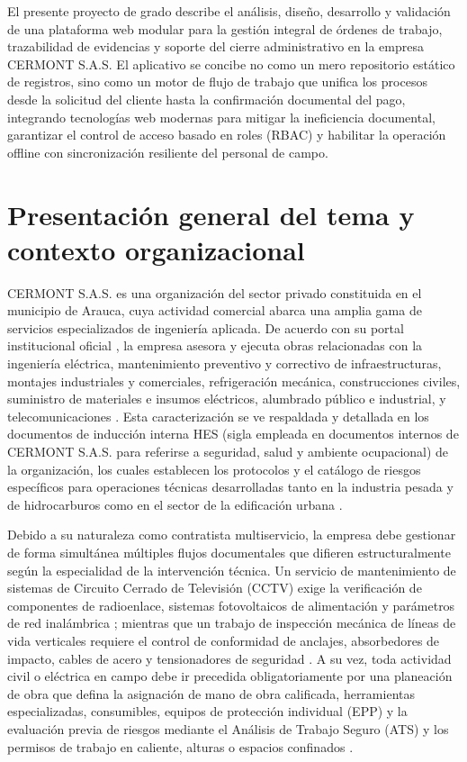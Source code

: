El presente proyecto de grado describe el análisis, diseño, desarrollo y validación de una plataforma web modular para la gestión integral de órdenes de trabajo, trazabilidad de evidencias y soporte del cierre administrativo en la empresa CERMONT S.A.S. El aplicativo se concibe no como un mero repositorio estático de registros, sino como un motor de flujo de trabajo que unifica los procesos desde la solicitud del cliente hasta la confirmación documental del pago, integrando tecnologías web modernas para mitigar la ineficiencia documental, garantizar el control de acceso basado en roles (RBAC) y habilitar la operación offline con sincronización resiliente del personal de campo.

\section{Presentación general del tema y contexto organizacional}
\label{sec:presentacion-general}

CERMONT S.A.S. es una organización del sector privado constituida en el municipio de Arauca, cuya actividad comercial abarca una amplia gama de servicios especializados de ingeniería aplicada. De acuerdo con su portal institucional oficial \cite{cermont_web}, la empresa asesora y ejecuta obras relacionadas con la ingeniería eléctrica, mantenimiento preventivo y correctivo de infraestructuras, montajes industriales y comerciales, refrigeración mecánica, construcciones civiles, suministro de materiales e insumos eléctricos, alumbrado público e industrial, y telecomunicaciones \cite{cermont_mision_web}. Esta caracterización se ve respaldada y detallada en los documentos de inducción interna HES (sigla empleada en documentos internos de CERMONT S.A.S. para referirse a seguridad, salud y ambiente ocupacional) de la organización, los cuales establecen los protocolos y el catálogo de riesgos específicos para operaciones técnicas desarrolladas tanto en la industria pesada y de hidrocarburos como en el sector de la edificación urbana \cite{cermont_hes}.

Debido a su naturaleza como contratista multiservicio, la empresa debe gestionar de forma simultánea múltiples flujos documentales que difieren estructuralmente según la especialidad de la intervención técnica. Un servicio de mantenimiento de sistemas de Circuito Cerrado de Televisión (CCTV) exige la verificación de componentes de radioenlace, sistemas fotovoltaicos de alimentación y parámetros de red inalámbrica \cite{formato_cctv}; mientras que un trabajo de inspección mecánica de líneas de vida verticales requiere el control de conformidad de anclajes, absorbedores de impacto, cables de acero y tensionadores de seguridad \cite{formato_lineas_vida}. A su vez, toda actividad civil o eléctrica en campo debe ir precedida obligatoriamente por una planeación de obra que defina la asignación de mano de obra calificada, herramientas especializadas, consumibles, equipos de protección individual (EPP) y la evaluación previa de riesgos mediante el Análisis de Trabajo Seguro (ATS) y los permisos de trabajo en caliente, alturas o espacios confinados \cite{formato_planeacion}.

